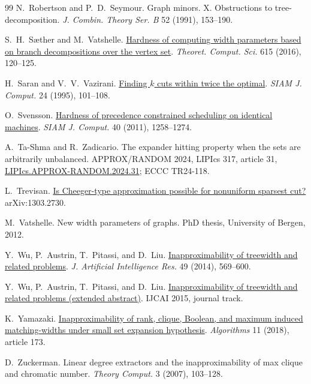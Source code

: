 \documentclass[11pt,letterpaper]{article}
\theoremstyle{definition}
\theoremstyle{remark}
\begin{document}
\begin{thebibliography}{99}
N.~Robertson and P.~D.~Seymour.
Graph minors. X. Obstructions to tree-decomposition.
\emph{J. Combin. Theory Ser. B} 52 (1991), 153--190.

S.~H.~S\ae{}ther and M.~Vatshelle.
\href{https://doi.org/10.1016/j.tcs.2015.11.039}{Hardness of computing width parameters based on branch decompositions over the vertex set}.
\emph{Theoret. Comput. Sci.} 615 (2016), 120--125.

H.~Saran and V.~V.~Vazirani.
\href{https://ics.uci.edu/~vazirani/k-cut.pdf}{Finding \(k\) cuts within twice the optimal}.
\emph{SIAM J. Comput.} 24 (1995), 101--108.

O.~Svensson.
\href{https://theory.epfl.ch/osven/Ola%20Svensson_publications/SICOMP11b.pdf}{Hardness of precedence constrained scheduling on identical machines}.
\emph{SIAM J. Comput.} 40 (2011), 1258--1274.

A.~Ta-Shma and R.~Zadicario.
The expander hitting property when the sets are arbitrarily unbalanced.
APPROX/RANDOM 2024, LIPIcs 317, article 31,
\href{https://drops.dagstuhl.de/storage/00lipics/lipics-vol317-approx-random2024/LIPIcs.APPROX-RANDOM.2024.31/LIPIcs.APPROX-RANDOM.2024.31.pdf}{LIPIcs.APPROX-RANDOM.2024.31}; ECCC TR24-118.

L.~Trevisan.
\href{https://arxiv.org/abs/1303.2730}{Is Cheeger-type approximation possible for nonuniform sparsest cut?}
arXiv:1303.2730.

M.~Vatshelle.
New width parameters of graphs.
PhD thesis, University of Bergen, 2012.

Y.~Wu, P.~Austrin, T.~Pitassi, and D.~Liu.
\href{https://doi.org/10.1613/jair.4030}{Inapproximability of treewidth and related problems}.
\emph{J. Artificial Intelligence Res.} 49 (2014), 569--600.

Y.~Wu, P.~Austrin, T.~Pitassi, and D.~Liu.
\href{https://ijcai.org/proceedings/2015/600}{Inapproximability of treewidth and related problems (extended abstract)}.
IJCAI 2015, journal track.

K.~Yamazaki.
\href{https://www.mdpi.com/1999-4893/11/11/173}{Inapproximability of rank, clique, Boolean, and maximum induced matching-widths under small set expansion hypothesis}.
\emph{Algorithms} 11 (2018), article 173.

D.~Zuckerman.
Linear degree extractors and the inapproximability of max clique and chromatic number.
\emph{Theory Comput.} 3 (2007), 103--128.

\end{thebibliography}
\end{document}

